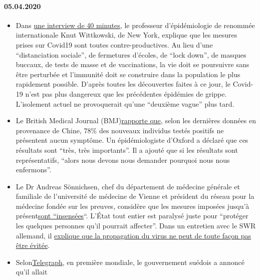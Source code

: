 \hypertarget{05042020}{%
\paragraph{05.04.2020}\label{05042020}}

\begin{itemize}
\tightlist
\item
  Dans \href{https://www.youtube.com/watch?v=lGC5sGdz4kg}{une interview
  de 40 minutes}, le professeur d'épidémiologie de renommée
  internationale Knut Wittkowski, de New York, explique que les mesures
  prises sur Covid19 sont toutes contre-productives. Au lieu d'une
  ``distanciation sociale'', de fermetures d'écoles, de ``lock down'',
  de masques buccaux, de tests de masse et de vaccinations, la vie doit
  se poursuivre sans être perturbée et l'immunité doit se construire
  dans la population le plus rapidement possible. D'après toutes les
  découvertes faites à ce jour, le Covid-19 n'est pas plus dangereux que
  les précédentes épidémies de grippe. L'isolement actuel ne
  provoquerait qu'une ``deuxième vague'' plus tard.
\item
  Le British Medical Journal
  (BMJ)\href{https://www.bmj.com/content/369/bmj.m1375}{rapporte que},
  selon les dernières données en provenance de Chine, 78\% des nouveaux
  individus testés positifs ne présentent aucun symptôme. Un
  épidémiologiste d'Oxford a déclaré que ces résultats sont ``très, très
  importants''. Il a ajouté que si les résultats sont représentatifs,
  ``alors nous devons nous demander pourquoi nous nous enfermons''.
\item
  Le Dr Andreas Sönnichsen, chef du département de médecine générale et
  familiale de l'université de médecine de Vienne et président du réseau
  pour la médecine fondée sur les preuves, considère que les mesures
  imposées jusqu'à
  présent\href{https://www.diepresse.com/5794224/was-machen-wir-da-auf-den-intensivstationen-eigentlich}{sont
  ``insensées}``. L'État tout entier est paralysé juste pour ``protéger
  les quelques personnes qu'il pourrait affecter''. Dans un entretien
  avec le SWR allemand, il
  \href{https://www.swr.de/swraktuell/radio/im-gespraech/corona-krise-wir-kommen-nicht-an-der-ausbreitung-vorbei-100.html}{explique
  que la propagation du virus ne peut de toute façon pas être évitée}.
\item
  Selon\href{https://www.telegraph.co.uk/news/2020/04/03/coronavirus-swedish-experiment-could-prove-britain-wrong/}{Telegraph},
  en première mondiale, le gouvernement suédois a annoncé qu'il allait

\end{itemize}

